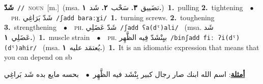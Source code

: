 \documentclass[10pt,a4paper,twoside]{article} %
\begin{document}
\begin{multicols}{2}
{\setlength\topsep{0pt}\textbf{\foreignlanguage{arabic}{شَدّ}}\ {\color{gray}\texttt{//}\color{black}}\ \textsc{noun}\ [m.]\ \color{gray}(msa. \foreignlanguage{arabic}{تضَييق}~\foreignlanguage{arabic}{\textbf{٣.}}  \foreignlanguage{arabic}{سَحْب}~\foreignlanguage{arabic}{\textbf{٢.}}  \foreignlanguage{arabic}{شَد}~\foreignlanguage{arabic}{\textbf{١.}})\color{black}\ \textbf{1.}~pulling  \textbf{2.}~tightening\ \ $\bullet$\ \ \textsc{ph.} \color{gray} \foreignlanguage{arabic}{شَدّ بَرَاغِي}\color{black}\ {\color{gray}\texttt{/{\sffamily ʃadd baraːɣi}/}\color{black}}\ \textbf{1.}~turning screws.  \textbf{2.}~toughening  \textbf{3.}~strengthening\ \ $\bullet$\ \ \textsc{ph.} \color{gray} \foreignlanguage{arabic}{شَدّ عَضَلِي}\color{black}\ {\color{gray}\texttt{/{\sffamily ʃadd ʕa(dˤ)ali}/}\color{black}}\ \color{gray} (msa. \foreignlanguage{arabic}{شَد عَضَلِي}~\foreignlanguage{arabic}{\textbf{١.}})\color{black}\ \textbf{1.}~muscle strain\ \ $\bullet$\ \ \textsc{ph.} \color{gray} \foreignlanguage{arabic}{بيِنْشَدّ فِيه الظَّهِر}\color{black}\ {\color{gray}\texttt{/{\sffamily binʃadd fiː ʔi(dˤ)(dˤ)ahir}/}\color{black}}\ \color{gray} (msa. \foreignlanguage{arabic}{يُعتمَد عليه}~\foreignlanguage{arabic}{\textbf{١.}})\color{black}\ \textbf{1.}~It is an idiomatic expression that means that you can depend on sb\  \begin{flushright}\color{gray}\foreignlanguage{arabic}{\textbf{\underline{\foreignlanguage{arabic}{أمثلة}}}: اسم الله ابنك صار رجال كبير بِنْشَد فيه الظَّهِر\ $\bullet$\ \  بحسه مايع بده شَد بَراغِي}\end{flushright}\color{black}} \vspace{2mm}


\end{multicols}
\end{document}

